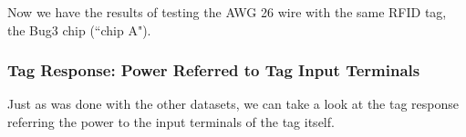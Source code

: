 \documentclass[12pt,onecolumn,titlepage]{article}
\begin{document}
Now we have the results of testing the AWG 26 wire with the same RFID tag, the Bug3 chip (``chip A").



\subsubsection{Tag Response: Power Referred to Tag Input Terminals}
\indent \indent Just as was done with the other datasets, we can take a look at the tag response referring the power to the input terminals of the tag itself. 
\end{document}

